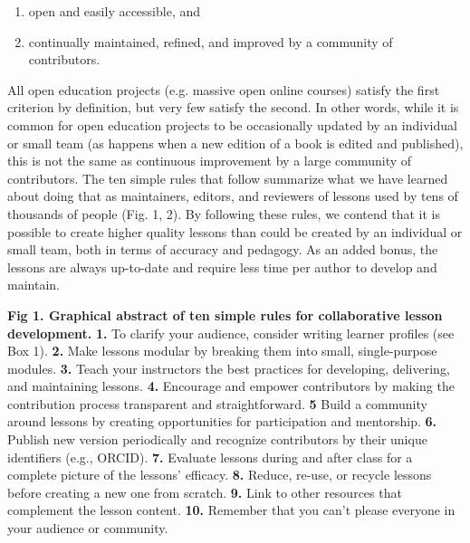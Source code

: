 \documentclass[10pt,letterpaper]{article}
\begin{document}
\begin{enumerate}

\item
  open and easily accessible, and

\item
  continually maintained, refined, and improved
  by a community of contributors.

\end{enumerate}

All open education projects (e.g. massive open online courses) satisfy the first criterion by definition,
but very few satisfy the second.
In other words,
while it is common for open education projects to be occasionally updated by an individual or small team
(as happens when a new edition of a book is edited and published),
this is not the same as continuous improvement by a large community of contributors.
The ten simple rules that follow summarize what we have learned about doing that
as maintainers, editors, and reviewers of lessons used by tens of thousands of people (Fig. 1, 2).
By following these rules,
we contend that it is possible to create higher quality lessons 
than could be created by an individual or small team,
both in terms of accuracy and pedagogy.
As an added bonus, the lessons are always up-to-date 
and require less time per author to develop and maintain.

\begin{mdframed}
\noindent
\textbf{Fig 1. Graphical abstract of ten simple rules for collaborative lesson development.} \textbf{1.} To clarify your audience, consider writing learner profiles (see Box 1). \textbf{2.} Make lessons modular by breaking them into small, single-purpose modules. \textbf{3.} Teach your instructors the best practices for developing, delivering, and maintaining lessons. \textbf{4.} Encourage and empower contributors by making the contribution process transparent and straightforward. \textbf{5} Build a community around lessons by creating opportunities for participation and mentorship. \textbf{6.} Publish new version periodically and recognize contributors by their unique identifiers (e.g., ORCID). \textbf{7.} Evaluate lessons during and after class for a complete picture of the lessons' efficacy. \textbf{8.} Reduce, re-use, or recycle lessons before creating a new one from scratch. \textbf{9.} Link to other resources that complement the lesson content. \textbf{10.} Remember that you can't please everyone in your audience or community.
\end{mdframed}
\end{document}

